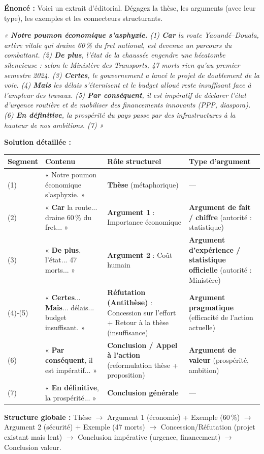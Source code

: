 \documentclass[11pt]{article}
\begin{document}
\begin{exoresolu}
\textbf{Énoncé :} Voici un extrait d'éditorial. Dégagez la thèse, les arguments (avec leur type), les exemples et les connecteurs structurants.

\textit{« \textbf{Notre poumon économique s'asphyxie.} (1) \textbf{Car} la route Yaoundé–Douala, artère vitale qui draine 60\,\% du fret national, est devenue un parcours du combattant. (2) \textbf{De plus}, l'état de la chaussée engendre une hécatombe silencieuse : selon le Ministère des Transports, 47 morts rien qu'au premier semestre 2024. (3) \textbf{Certes}, le gouvernement a lancé le projet de doublement de la voie. (4) \textbf{Mais} les délais s'éternisent et le budget alloué reste insuffisant face à l'ampleur des travaux. (5) \textbf{Par conséquent}, il est impératif de déclarer l'état d'urgence routière et de mobiliser des financements innovants (PPP, diaspora). (6) \textbf{En définitive}, la prospérité du pays passe par des infrastructures à la hauteur de nos ambitions. (7) »}

\tcblower
\textbf{Solution détaillée :}

\begin{center}
\begin{tabularx}{\linewidth}{|l|X|X|l|}
\hline
\rowcolor{popblueL}
\textbf{Segment} & \textbf{Contenu} & \textbf{Rôle structurel} & \textbf{Type d'argument} \\ \hline
(1) & « Notre poumon économique s'asphyxie. » & \textbf{Thèse} (métaphorique) & — \\ \hline
(2) & « \textbf{Car} la route... draine 60\,\% du fret... » & \textbf{Argument 1} : Importance économique & \textbf{Argument de fait / chiffre} (autorité : statistique) \\ \hline
(3) & « \textbf{De plus}, l'état... 47 morts... » & \textbf{Argument 2} : Coût humain & \textbf{Argument d'expérience / statistique officielle} (autorité : Ministère) \\ \hline
(4)-(5) & « \textbf{Certes}... \textbf{Mais}... délais... budget insuffisant. » & \textbf{Réfutation (Antithèse)} : Concession sur l'effort + Retour à la thèse (insuffisance) & \textbf{Argument pragmatique} (efficacité de l'action actuelle) \\ \hline
(6) & « \textbf{Par conséquent}, il est impératif... » & \textbf{Conclusion / Appel à l'action} (reformulation thèse + proposition) & \textbf{Argument de valeur} (prospérité, ambition) \\ \hline
(7) & « \textbf{En définitive}, la prospérité... » & \textbf{Conclusion générale} & — \\ \hline
\end{tabularx}
\end{center}

\textbf{Structure globale :} Thèse $\to$ Argument 1 (économie) + Exemple (60\,\%) $\to$ Argument 2 (sécurité) + Exemple (47 morts) $\to$ Concession/Réfutation (projet existant mais lent) $\to$ Conclusion impérative (urgence, financement) $\to$ Conclusion valeur.
\end{exoresolu}
\end{document}
